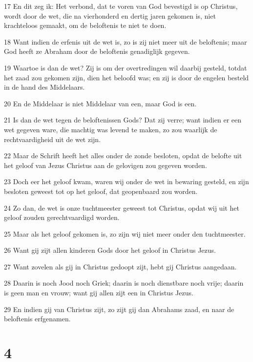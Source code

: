 \par 17 En dit zeg ik: Het verbond, dat te voren van God bevestigd is op Christus, wordt door de wet, die na vierhonderd en dertig jaren gekomen is, niet krachteloos gemaakt, om de beloftenis te niet te doen.
\par 18 Want indien de erfenis uit de wet is, zo is zij niet meer uit de beloftenis; maar God heeft ze Abraham door de beloftenis genadiglijk gegeven.
\par 19 Waartoe is dan de wet? Zij is om der overtredingen wil daarbij gesteld, totdat het zaad zou gekomen zijn, dien het beloofd was; en zij is door de engelen besteld in de hand des Middelaars.
\par 20 En de Middelaar is niet Middelaar van een, maar God is een.
\par 21 Is dan de wet tegen de beloftenissen Gods? Dat zij verre; want indien er een wet gegeven ware, die machtig was levend te maken, zo zou waarlijk de rechtvaardigheid uit de wet zijn.
\par 22 Maar de Schrift heeft het alles onder de zonde besloten, opdat de belofte uit het geloof van Jezus Christus aan de gelovigen zou gegeven worden.
\par 23 Doch eer het geloof kwam, waren wij onder de wet in bewaring gesteld, en zijn besloten geweest tot op het geloof, dat geopenbaard zou worden.
\par 24 Zo dan, de wet is onze tuchtmeester geweest tot Christus, opdat wij uit het geloof zouden gerechtvaardigd worden.
\par 25 Maar als het geloof gekomen is, zo zijn wij niet meer onder den tuchtmeester.
\par 26 Want gij zijt allen kinderen Gods door het geloof in Christus Jezus.
\par 27 Want zovelen als gij in Christus gedoopt zijt, hebt gij Christus aangedaan.
\par 28 Daarin is noch Jood noch Griek; daarin is noch dienstbare noch vrije; daarin is geen man en vrouw; want gij allen zijt een in Christus Jezus.
\par 29 En indien gij van Christus zijt, zo zijt gij dan Abrahams zaad, en naar de beloftenis erfgenamen.

\chapter{4}

